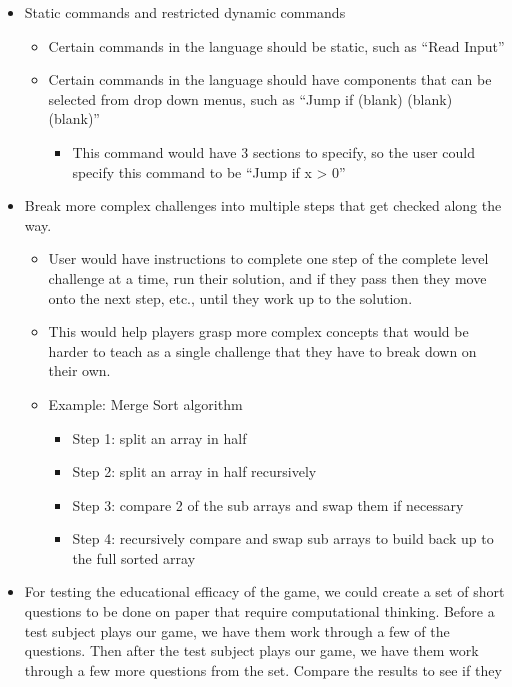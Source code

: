 \begin{itemize}
  \item Static commands and restricted dynamic commands
  \begin{itemize}
    \item Certain commands in the language should be static, such as “Read
    Input”
    \item Certain commands in the language should have components that can be
    selected from drop down menus, such as “Jump if (blank) (blank) (blank)”
    \begin{itemize}
      \item This command would have 3 sections to specify, so the user could
      specify this command to be “Jump if x > 0”
    \end{itemize}
  \end{itemize}
  \item Break more complex challenges into multiple steps that get checked along
  the way.
  \begin{itemize}
    \item User would have instructions to complete one step of the complete
    level challenge at a time, run their solution, and if they pass then they
    move onto the next step, etc., until they work up to the solution.
    \item This would help players grasp more complex concepts that would be
    harder to teach as a single challenge that they have to break down on their
    own.
    \item Example: Merge Sort algorithm
    \begin{itemize}
      \item Step 1: split an array in half
      \item Step 2: split an array in half recursively
      \item Step 3: compare 2 of the sub arrays and swap them if necessary
      \item Step 4: recursively compare and swap sub arrays to build back up to
      the full sorted array
    \end{itemize}
  \end{itemize}
  \item For testing the educational efficacy of the game, we could create a set
  of short questions to be done on paper that require computational thinking.
  Before a test subject plays our game, we have them work through a few of the
  questions. Then after the test subject plays our game, we have them work
  through a few more questions from the set. Compare the results to see if they

\end{itemize}
